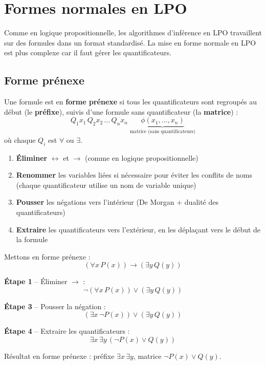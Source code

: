 \documentclass[11pt,a4paper]{article}
\begin{document}
\section{Formes normales en LPO}

Comme en logique propositionnelle, les algorithmes d'inférence en LPO travaillent sur des formules dans un format standardisé. La mise en forme normale en LPO est plus complexe car il faut gérer les quantificateurs.

\subsection{Forme prénexe}

\begin{definitionbox}
Une formule est en \textbf{forme prénexe} si tous les quantificateurs sont regroupés au début (le \textbf{préfixe}), suivis d'une formule sans quantificateur (la \textbf{matrice}) :
$$Q_1 x_1 \, Q_2 x_2 \, \ldots \, Q_n x_n \; \underbrace{\phi(x_1, \ldots, x_n)}_{\text{matrice (sans quantificateurs)}}$$
où chaque $Q_i$ est $\forall$ ou $\exists$.
\end{definitionbox}

\begin{recipebox}
\begin{enumerate}
    \item \textbf{Éliminer} $\leftrightarrow$ et $\rightarrow$ (comme en logique propositionnelle)
    \item \textbf{Renommer} les variables liées si nécessaire pour éviter les conflits de noms (chaque quantificateur utilise un nom de variable unique)
    \item \textbf{Pousser} les négations vers l'intérieur (De Morgan + dualité des quantificateurs)
    \item \textbf{Extraire} les quantificateurs vers l'extérieur, en les déplaçant vers le début de la formule
\end{enumerate}
\end{recipebox}

\begin{exemplebox}
Mettons en forme prénexe :
$$(\forall x \, P(x)) \rightarrow (\exists y \, Q(y))$$

\textbf{Étape 1} -- Éliminer $\rightarrow$ :
$$\neg(\forall x \, P(x)) \lor (\exists y \, Q(y))$$

\textbf{Étape 3} -- Pousser la négation :
$$(\exists x \, \neg P(x)) \lor (\exists y \, Q(y))$$

\textbf{Étape 4} -- Extraire les quantificateurs :
$$\exists x \, \exists y \, (\neg P(x) \lor Q(y))$$

Résultat en forme prénexe : préfixe $\exists x \, \exists y$, matrice $\neg P(x) \lor Q(y)$.
\end{exemplebox}
\end{document}
